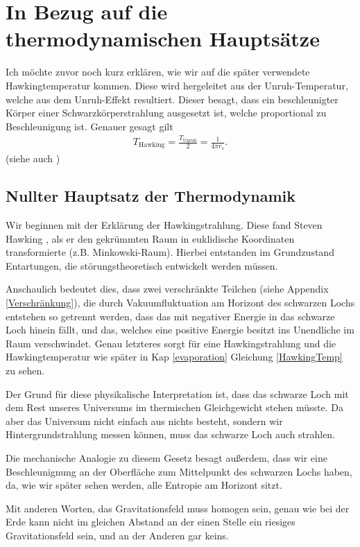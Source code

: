 \documentclass[ngerman]{scrartcl}
\begin{document}
\section{In Bezug auf die thermodynamischen Hauptsätze}
Ich möchte zuvor noch kurz erklären, wie wir auf die später verwendete Hawkingtemperatur kommen. Diese wird hergeleitet aus der Unruh-Temperatur, welche aus dem Unruh-Effekt resultiert. Dieser besagt, dass ein beschleunigter Körper einer Schwarzkörperstrahlung ausgesetzt ist, welche proportional zu Beschleunigung ist. 
Genauer gesagt gilt
	\begin{align}
		T_{\mathrm{Hawking}} = \frac{T_{\mathrm{Unruh}}}{2} = \frac{1}{4 \pi r_s}.
	\end{align}
(siehe auch \cite{JerusalemsLectures})

	\subsection{Nullter Hauptsatz der Thermodynamik}
	Wir beginnen mit der Erklärung der Hawkingstrahlung. Diese fand Steven Hawking \cite{ParticleCreation}, als er den gekrümmten Raum in euklidische Koordinaten transformierte (z.B. Minkowski-Raum). Hierbei entstanden im Grundzustand Entartungen, die störungstheoretisch entwickelt werden müssen. 
	
	Anschaulich bedeutet dies, dass zwei verschränkte Teilchen (siehe Appendix \ref{Verschränkung}), die durch Vakuumfluktuation am Horizont des schwarzen Lochs entstehen so getrennt werden, dass das mit negativer Energie in das schwarze Loch hinein fällt, und das, welches eine positive Energie besitzt ins Unendliche im Raum verschwindet. 
	Genau letzteres sorgt für eine Hawkingstrahlung und die Hawkingtemperatur wie später in Kap \ref{evaporation} Gleichung \eqref{HawkingTemp} zu sehen.
	
	Der Grund für diese physikalische Interpretation ist, dass das schwarze Loch mit dem Rest unseres Universums im thermischen Gleichgewicht stehen müsste. Da aber das Universum nicht einfach aus nichts besteht, sondern wir Hintergrundstrahlung messen können, muss das schwarze Loch auch strahlen. 
	
	Die mechanische Analogie zu diesem Gesetz besagt außerdem, dass wir eine Beschleunignung an der Oberfläche zum Mittelpunkt des schwarzen Lochs haben, da, wie wir später sehen werden, alle Entropie am Horizont sitzt. 
	
	Mit anderen Worten, das Gravitationsfeld muss homogen sein, genau wie bei der Erde kann nicht im gleichen Abstand an der einen Stelle ein riesiges Gravitationsfeld sein, und an der Anderen gar keins.
\end{document}
